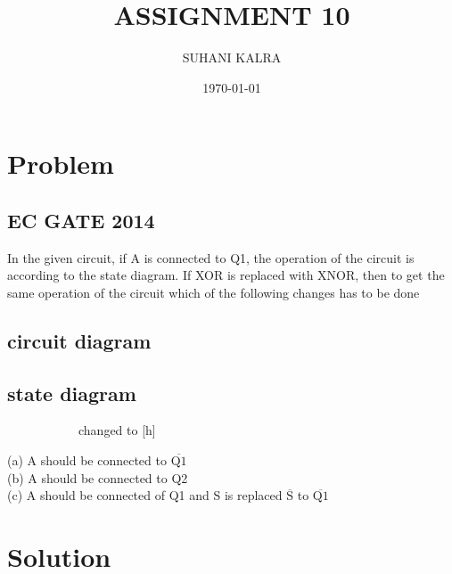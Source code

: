\documentclass{article}
\title{ASSIGNMENT 10 }
\author{SUHANI KALRA}
\date{\today}
\begin{document}
\maketitle





\section{Problem}




\subsection{EC GATE 2014 }

\footnotesize
 In the given circuit, if A is connected to Q1, the operation of the circuit is according to the state diagram. If XOR is replaced with XNOR, then to get the same operation of the circuit which of the following changes has to be done

\subsection{circuit diagram}
\subsection{state diagram}
 \begin{figure}[h]
  \centering
  \begin{subfigure}[h]{0.5\textwidth} \scalebox{0.7}{} 
  \end{subfigure}
   \hfill
  \begin{subfigure}[h]{0.4\textwidth} changed to [h]
    \scalebox{0.6}{} 
  \end{subfigure}
\end{figure}
\text

(a) A should be connected to $\overline{\mbox{Q1}}$\\

(b) A should be connected to Q2\\

(c) A should be connected of Q1 and S is replaced $\overline{\mbox{S}}$  to $\overline{\mbox{Q1}}$ 

\newpage
\large

\section{Solution}
\end{document}
